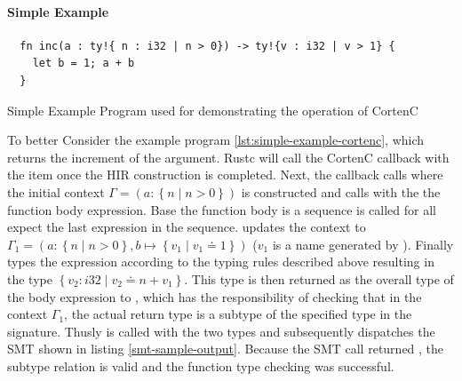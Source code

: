 \documentclass[twoside, english]{sdqthesis}
\newcommand{\set}[1]{\left\{ #1 \right\}}
\theoremstyle{definition}
\begin{document}
\paragraph{Simple Example}

\begin{listing}[h]
  \begin{verbatim}
  fn inc(a : ty!{ n : i32 | n > 0}) -> ty!{v : i32 | v > 1} {
    let b = 1; a + b
  }
  \end{verbatim}
  \caption{Simple Example Program used for demonstrating the operation of CortenC}
  \label{lst:simple-example-cortenc}
\end{listing}

To better 
Consider the example program \ref{lst:simple-example-cortenc}, which returns the increment of the argument.
Rustc will call the CortenC callback with the item  once the HIR construction is completed. Next, the callback calls  where the initial context $\Gamma = ( a : \set{n \mid n > 0})$ is constructed and calls  with the the function body expression. Base the function body is a sequence  is called for all expect the last expression in the sequence.  updates the context to $\Gamma_1 = (a : \set{n \mid n > 0}, b \mapsto \set{v_1 \mid v_1 \doteq 1})$ ($v_1$ is a name generated by ). 
Finally  types the expression  according to the typing rules described above resulting in the type $\set{ v_2 : i32 \mid v_2 \doteq n + v_1}$.
This type is then returned as the overall type of the body expression to , which has the responsibility of checking that in the context $\Gamma_1$, the actual return type is a subtype of the specified type in the signature. 
Thusly  is called with the two types and subsequently dispatches the SMT shown in listing \ref{smt-sample-output}. 
Because the SMT call returned , the subtype relation is valid and the function type checking was successful.
\end{document}
